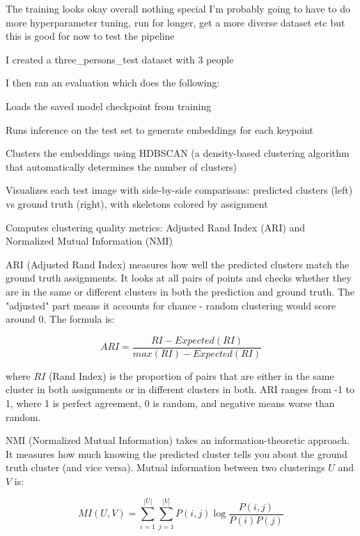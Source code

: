 The training looks okay overall nothing special I'm probably going to have to do more hyperparameter tuning, run for longer,
get a more diverse dataset etc but this is good for now to test the pipeline

I created a three\_persons\_test dataset with 3 people

I then ran an evaluation which does the following:

\begin{compactitem}
  \item Loads the saved model checkpoint from training
  \item Runs inference on the test set to generate embeddings for each keypoint
  \item Clusters the embeddings using HDBSCAN (a density-based clustering algorithm that automatically determines the number of clusters)
  \item Visualizes each test image with side-by-side comparisons: predicted clusters (left) vs ground truth (right), with skeletons colored by assignment
  \item Computes clustering quality metrics: Adjusted Rand Index (ARI) and Normalized Mutual Information (NMI)
\end{compactitem}

ARI (Adjusted Rand Index) measures how well the predicted clusters match the ground truth assignments.
It looks at all pairs of points and checks whether they are in the same or different clusters in both the prediction and ground truth.
The "adjusted" part means it accounts for chance - random clustering would score around 0.
The formula is:

\begin{equation}
ARI = \frac{RI - Expected(RI)}{max(RI) - Expected(RI)}
\label{eq:ari}
\end{equation}

where $RI$ (Rand Index) is the proportion of pairs that are either in the same cluster in both assignments or in different clusters in both.
ARI ranges from -1 to 1, where 1 is perfect agreement, 0 is random, and negative means worse than random.

NMI (Normalized Mutual Information) takes an information-theoretic approach.
It measures how much knowing the predicted cluster tells you about the ground truth cluster (and vice versa).
Mutual information between two clusterings $U$ and $V$ is:

\begin{equation}
MI(U, V) = \sum_{i=1}^{|U|} \sum_{j=1}^{|V|} P(i, j) \log \frac{P(i, j)}{P(i)P(j)}
\label{eq:mi}
\end{equation}

